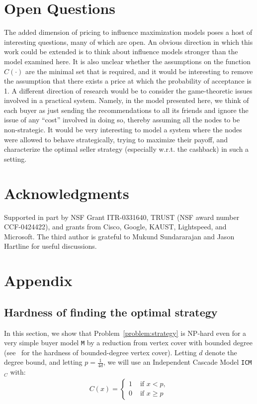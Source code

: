 \documentclass[letterpaper,twoside]{article}
\newcommand{\M}{\texttt{M}}
\newcommand{\ICM}[1]{\texttt{ICM}$_{#1}$}
\begin{document}
\section{Open Questions}
The added dimension of pricing to influence maximization models poses a host
of interesting questions, many of which are open. An obvious direction in
which this work could be extended is to think about influence models stronger
than the model examined here. It is also unclear whether the assumptions on
the function $C(\cdot)$ are the minimal set that is required, and it would be
interesting to remove the assumption that there exists a price at which the
probability of acceptance is 1. A different direction of research would be to
consider the game-theoretic issues involved in a practical system. Namely, in
the model presented here, we think of each buyer as just sending the
recommendations to all its friends and ignore the issue of any ``cost''
involved in doing so, thereby assuming all the nodes to be non-strategic. It
would be very interesting to model a system where the nodes were allowed to
behave strategically, trying to maximize their payoff, and characterize the
optimal seller strategy (especially w.r.t. the cashback) in such a setting.

\section{Acknowledgments}
Supported in part by NSF Grant ITR-0331640, TRUST (NSF award number
CCF-0424422), and grants from Cisco, Google, KAUST, Lightspeed, and
Microsoft. The third author is grateful to Mukund Sundararajan and Jason
Hartline for useful discussions.




\section{Appendix}
\vspace{2mm}
\subsection{Hardness of finding the optimal strategy}
\label{sec:nphard}
In this section, we show that Problem~\ref{problem:strategy} is
NP-hard even for a very simple buyer model \M{} by a reduction from
vertex cover with bounded degree (see~\cite{GJ79} for the hardness of
bounded-degree vertex cover). Letting $d$ denote the degree
bound, and letting $p = \frac{1}{4d}$, we will use an Independent
Cascade Model \ICM{C} with:
\begin{eqnarray*}
    C(x) = \left\{
      \begin{array}{ll}
        1 & \textrm{ if } x < p,\\
        0 & \textrm{ if } x \ge p
      \end{array}\right.
\end{eqnarray*}
\end{document}

